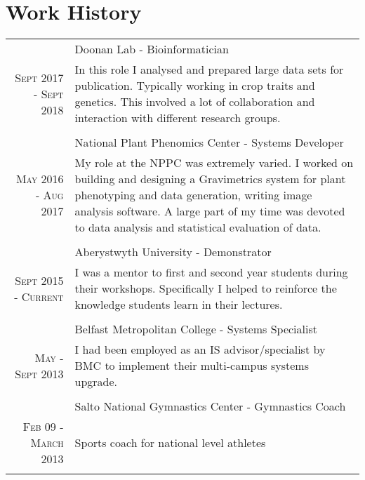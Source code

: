 \documentclass[a4paper,10pt]{article}
\begin{document}
\section{Work History}
  \begin{longtable}{r|p{9cm}}

    &Doonan Lab - Bioinformatician \\\textsc{Sept 2017 - Sept 2018}
    &\footnotesize{In this role I analysed and prepared large data sets for publication. Typically working in crop traits and genetics. This involved a lot of collaboration and interaction with different research groups.}\\\multicolumn{2}{c}{} \\

    &National Plant Phenomics Center -  Systems Developer \\\textsc{May 2016 - Aug 2017}
    &\footnotesize{
      My role at the NPPC was extremely varied. I worked on building and designing a Gravimetrics system for plant phenotyping and data generation, writing image analysis software. A large part of my time was devoted to data analysis and statistical evaluation of data.}\\\multicolumn{2}{c}{} \\


    &Aberystwyth University -  Demonstrator \\ \textsc{Sept 2015 - Current}
    &\footnotesize{I was a mentor to first and second year students during their workshops. Specifically I helped to reinforce the knowledge students learn in their lectures.}\\\multicolumn{2}{c}{} \\

    &Belfast Metropolitan College - Systems Specialist \\\textsc{May - Sept 2013}
    &\footnotesize{I had been employed as an IS advisor/specialist by BMC to implement their multi-campus systems upgrade.}\\\multicolumn{2}{c}{} \\

    &Salto National Gymnastics Center - Gymnastics Coach \\\textsc{Feb 09 - March 2013}
     & \footnotesize{Sports coach for national level athletes}\\\multicolumn{2}{c}{} \\
  \end{longtable}
\end{document}
